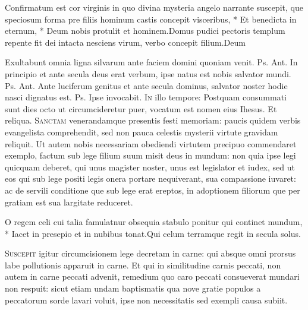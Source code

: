 \begin{multicols*}{2}
\begin{responsory-final}
{Confirmatum est cor virginis in quo divina mysteria angelo narrante suscepit, que speciosum forma pre filiis hominum castis concepit visceribus, * Et benedicta in eternum, * Deum nobis protulit et hominem.}{Domus pudici pectoris templum repente fit dei intacta nesciens virum, verbo concepit filium.}{Deum}
\end{responsory-final}
 Exultabunt omnia ligna silvarum ante faciem domini quoniam venit. {\color{Red} Ps.}  {\color{Red} Ant.} In principio et ante secula deus erat verbum, ipse natus est nobis salvator mundi. {\color{Red} Ps.}  {\color{Red} Ant.} Ante luciferum genitus et ante secula dominus, salvator noster hodie nasci dignatus est. {\color{Red} Ps.}  \V Ipse invocabit.
\lettrine[lines=2]{\zallmancaps \color{Red} I}{n} illo tempore: Postquam consummati sunt dies octo ut circumcideretur puer, vocatum est nomen eius Ihesus. Et reliqua.
 
\lettrine[lines=2]{\zallmancaps \color{Blue} S}{anctam} venerandamque presentis festi memoriam: paucis quidem verbis evangelista comprehendit, sed non pauca celestis mysterii virtute gravidam reliquit. Ut autem nobis necessariam obediendi virtutem precipuo commendaret exemplo, factum sub lege filium suum misit deus in mundum: non quia ipse legi quicquam deberet, qui unus magister noster, unus est legislator et iudex, sed ut eos qui sub lege positi legis onera portare nequiverant, sua compassione iuvaret: ac de servili conditione que sub lege erat ereptos, in adoptionem filiorum que per gratiam est sua largitate reduceret.
\begin{responsory}
{O regem celi cui talia famulatnur obsequia stabulo ponitur qui continet mundum, * Iacet in presepio et in nubibus tonat.}{Qui celum terramque regit in secula solus.}
\end{responsory}
\lettrine[lines=2]{\zallmancaps \color{Red} S}{uscepit} igitur circumcisionem lege decretam in carne: qui absque omni prorsus labe pollutionis apparuit in carne. Et qui in similitudine carnis peccati, non autem in carne peccati advenit, remedium quo caro peccati consueverat mundari non respuit: sicut etiam undam baptismatis qua nove gratie populos a peccatorum sorde lavari voluit, ipse non necessitatis sed exempli causa subiit.

\end{multicols*}
